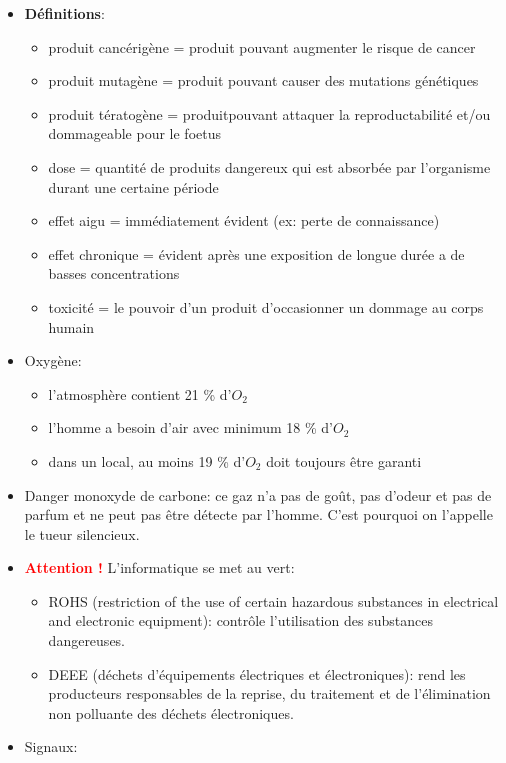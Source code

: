 \documentclass[a4paper]{article}
\begin{document}
\begin{itemize}
\item \textbf{Définitions}:
\begin{itemize}
    \item produit cancérigène = produit pouvant augmenter le risque de cancer
    \item produit mutagène = produit pouvant causer des mutations génétiques
    \item produit tératogène = produitpouvant attaquer la reproductabilité et/ou dommageable pour le foetus
    \item dose = quantité de produits dangereux qui est absorbée par l’organisme durant une certaine période
    \item effet aigu = immédiatement évident (ex: perte de connaissance)
    \item effet chronique =  évident après une exposition de longue durée a de basses concentrations
    \item toxicité = le pouvoir d'un produit d’occasionner un dommage au corps humain
\end{itemize}





\item Oxygène:
\begin{itemize}
    \item l'atmosphère contient 21 \% d'$ O_2 $
    \item l'homme a besoin d'air avec minimum 18 \% d'$ O_2 $
    \item dans un local, au moins 19 \% d'$ O_2 $ doit toujours être garanti
\end{itemize}





\item Danger monoxyde de carbone: ce gaz n’a pas de goût, pas d’odeur et pas de parfum et ne peut pas être détecte par l’homme. C’est pourquoi on l’appelle le tueur silencieux.





\item \textcolor{red}{\textbf{Attention !}} L’informatique se met au vert:
\begin{itemize}
    \item ROHS (restriction of the use of certain hazardous substances in electrical and electronic equipment): contrôle l’utilisation des substances dangereuses.
    \item DEEE (déchets d’équipements électriques et électroniques): rend les producteurs responsables de la reprise, du traitement et de l’élimination non polluante des déchets électroniques.
\end{itemize}





\item Signaux:

\end{itemize}
\end{document}
